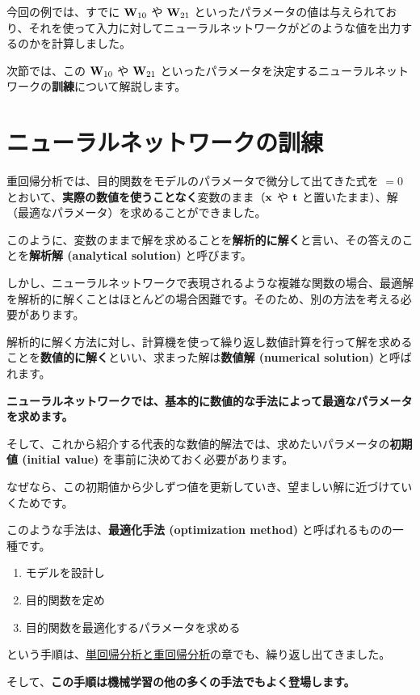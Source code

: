 今回の例では、すでに ${\bf W}_{10}$ や ${\bf W}_{21}$ といったパラメータの値は与えられており、それを使って入力に対してニューラルネットワークがどのような値を出力するのかを計算しました。


次節では、この ${\bf W}_{10}$ や ${\bf W}_{21}$ といったパラメータを決定するニューラルネットワークの\textbf{訓練}について解説します。


\section{ニューラルネットワークの訓練}


重回帰分析では、目的関数をモデルのパラメータで微分して出てきた式を $= 0$ とおいて、\textbf{実際の数値を使うことなく}変数のまま（${\bf x}$ や ${\bf t}$ と置いたまま）、解（最適なパラメータ）を求めることができました。

このように、変数のままで解を求めることを\textbf{解析的に解く}と言い、その答えのことを\textbf{解析解 (analytical solution)} と呼びます。


しかし、ニューラルネットワークで表現されるような複雑な関数の場合、最適解を解析的に解くことはほとんどの場合困難です。そのため、別の方法を考える必要があります。


解析的に解く方法に対し、計算機を使って繰り返し数値計算を行って解を求めることを\textbf{数値的に解く}といい、求まった解は\textbf{数値解 (numerical solution)} と呼ばれます。


\textbf{ニューラルネットワークでは、基本的に数値的な手法によって最適なパラメータを求めます。}


そして、これから紹介する代表的な数値的解法では、求めたいパラメータの\textbf{初期値 (initial value)} を事前に決めておく必要があります。

なぜなら、この初期値から少しずつ値を更新していき、望ましい解に近づけていくためです。


このような手法は、\textbf{最適化手法 (optimization method)} と呼ばれるものの一種です。


\begin{enumerate}
\item モデルを設計し
\item 目的関数を定め
\item 目的関数を最適化するパラメータを求める
\end{enumerate}


という手順は、\href{markdown/ch21-regression-analysis.md}{単回帰分析と重回帰分析}の章でも、繰り返し出てきました。

そして、\textbf{この手順は機械学習の他の多くの手法でもよく登場します。}

